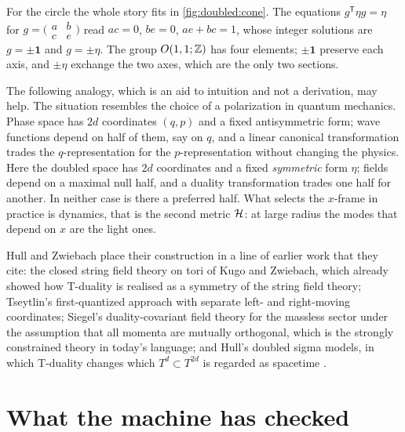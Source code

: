 For the circle the whole story fits in \cref{fig:doubled:cone}. The equations
$g^{\mathsf T}\eta g=\eta$ for $g=\bigl(\begin{smallmatrix}a&b\\c&e\end{smallmatrix}\bigr)$
read $ac=0$, $be=0$, $ae+bc=1$, whose integer solutions are $g=\pm\mathbf 1$ and $g=\pm\eta$.
The group $O(1,1;\mathbb{Z})$ has four elements; $\pm\mathbf1$ preserve each axis, and $\pm\eta$
exchange the two axes, which are the only two sections.

\begin{physicsbox}
The following analogy, which is an aid to intuition and not a derivation, may help. The
situation resembles the choice of a polarization in quantum mechanics. Phase space has
$2d$ coordinates $(q,p)$ and a fixed antisymmetric form; wave functions depend on half of them,
say on $q$, and a linear canonical transformation trades the $q$-representation for the
$p$-representation without changing the physics. Here the doubled space has $2d$ coordinates
and a fixed \emph{symmetric} form $\eta$; fields depend on a maximal null half, and a duality
transformation trades one half for another. In neither case is there a preferred half. What
selects the $x$-frame in practice is dynamics, that is the second metric $\mathcal{H}$: at large radius
the modes that depend on $x$ are the light ones.
\end{physicsbox}

\begin{historybox}
Hull and Zwiebach place their construction in a line of earlier work that they cite: the closed
string field theory on tori of Kugo and Zwiebach, which already showed how T-duality is realised
as a symmetry of the string field theory; Tseytlin's first-quantized approach with separate
left- and right-moving coordinates; Siegel's duality-covariant field theory for the massless
sector under the assumption that all momenta are mutually orthogonal, which is the strongly
constrained theory in today's language; and Hull's doubled sigma models, in which T-duality
changes which $T^d\subset T^{2d}$ is regarded as spacetime .
\end{historybox}

\section{What the machine has checked}\label{sec:doubled:lean}

